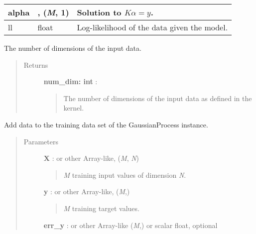 \documentclass[letterpaper,10pt,english]{sphinxmanual}
\begin{document}
\begin{fulllineitems}
\begin{tabulary}{\linewidth}{|L|L|L|}
alpha
 & 
, (\emph{M}, 1)
 & 
Solution to $K\alpha=y$.
\\\hline

ll
 & 
float
 & 
Log-likelihood of the data given the model.
\\\hline
\end{tabulary}


\begin{fulllineitems}
\label{gptools:gptools.gaussian_process.GaussianProcess.num_dim}
The number of dimensions of the input data.
\begin{quote}\begin{description}
\item[{Returns }] \leavevmode
\textbf{num\_dim: int} :
\begin{quote}

The number of dimensions of the input data as defined in the kernel.
\end{quote}

\end{description}\end{quote}

\end{fulllineitems}


\begin{fulllineitems}
\label{gptools:gptools.gaussian_process.GaussianProcess.add_data}
Add data to the training data set of the GaussianProcess instance.
\begin{quote}\begin{description}
\item[{Parameters }] \leavevmode
\textbf{X} :  or other Array-like, (\emph{M}, \emph{N})
\begin{quote}

\emph{M} training input values of dimension \emph{N}.
\end{quote}

\textbf{y} :  or other Array-like, (\emph{M},)
\begin{quote}

\emph{M} training target values.
\end{quote}

\textbf{err\_y} :  or other Array-like (\emph{M},) or scalar float, optional
\begin{quote}


\end{quote}
\end{description}
\end{quote}
\end{fulllineitems}
\end{fulllineitems}
\end{document}
